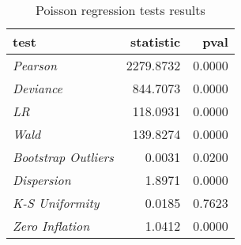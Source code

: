 \begin{wraptable}{r}{3.5in}

\caption{\label{tab:poisson_reg_tests}Poisson regression tests results}
\centering
\fontsize{9}{11}\selectfont
\begin{tabular}[t]{>{}lrr}
\toprule
test & statistic & pval\\
\midrule
\em{Pearson} & 2279.8732 & 0.0000\\
\em{Deviance} & 844.7073 & 0.0000\\
\em{LR} & 118.0931 & 0.0000\\
\em{Wald} & 139.8274 & 0.0000\\
\em{Bootstrap Outliers} & 0.0031 & 0.0200\\
\addlinespace
\em{Dispersion} & 1.8971 & 0.0000\\
\em{K-S Uniformity} & 0.0185 & 0.7623\\
\em{Zero Inflation} & 1.0412 & 0.0000\\
\bottomrule
\end{tabular}
\end{wraptable}
